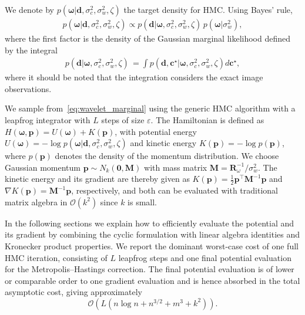 \documentclass[12pt]{article}
\begin{document}
We denote by $p(\bm{\omega}|\bm{d}, \sigma_c^2, \sigma_w^2, \zeta)$ the target density for HMC.
Using Bayes' rule, 
\begin{equation} \label{eq:wavelet_marginal}
\begin{split}
    p(\bm{\omega}|\bm{d}, \sigma_c^2, \sigma_w^2, \zeta) 
    \propto 
    p(\bm{d} | \bm{\omega}, \sigma_c^2, \sigma_w^2, \zeta) \, p(\bm{\omega}|\sigma_w^2),
\end{split}
\end{equation}
where the first factor is the density of the Gaussian marginal likelihood defined by the integral
\begin{equation} \label{eq:marginal_likelihood}
\begin{split}
    p(\bm{d} | \bm{\omega}, \sigma_c^2, \sigma_w^2, \zeta) \, =\int{p(\bm{d}, \bm{c}^{\star}| \bm{\omega}, \sigma_c^2, \sigma_w^2, \zeta) d\bm{c}^{\star}},
\end{split}
\end{equation}
where it should be noted that the integration considers the exact image observations.


We sample from~\eqref{eq:wavelet_marginal} using the generic HMC algorithm \cite{Neal2011} with a leapfrog integrator with $L$ steps of size $\varepsilon$. The Hamiltonian is defined as $H(\bm{\omega}, \bm{p}) = U(\bm{\omega}) + K(\bm{p})$, with potential energy $U(\bm{\omega}) = -\log{p(\bm{\omega}|\bm{d}, \sigma_c^2, \sigma_w^2, \zeta) }$ and kinetic energy $K(\bm{p}) = -\log p(\bm{p})$, where $p(\bm{p})$ denotes the density of the momentum distribution.
We choose Gaussian momentum $\bm{p} \sim N_{k}(\bm{0}, \bm{M})$ with mass matrix $\bm{M}=\bm{R}_{\omega}^{-1}/\sigma_w^2$. The kinetic energy and its gradient are thereby given as $K(\bm{p}) = \frac{1}{2}\bm{p}^{\top}\bm{M}^{-1}\bm{p}$ and $\nabla K(\bm{p}) = \bm{M}^{-1}\bm{p}$, respectively, and both can be evaluated with traditional matrix algebra in $\mathcal{O}(k^2)$ since $k$ is small. 

In the following sections we explain how to efficiently evaluate the
potential and its gradient by combining the cyclic formulation with
linear algebra identities and Kronecker product properties. We report
the dominant worst-case cost of one full HMC iteration, consisting of
$L$ leapfrog steps and one final potential evaluation for the
Metropolis--Hastings correction. 
The final potential evaluation is of
lower or comparable order to one gradient evaluation and is hence
absorbed in the total asymptotic cost, giving approximately
\[
    \mathcal O\!\left(
    L\left(n\log n + n^{3/2} + m^3 + k^2\right)
    \right).
\]
\end{document}
